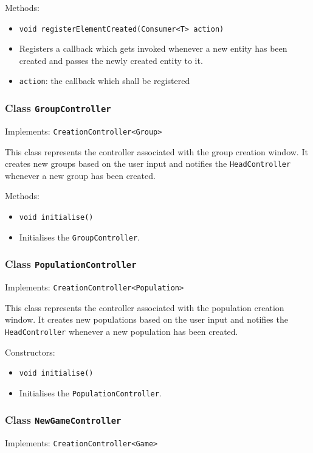 \documentclass[parskip=full,11pt]{scrartcl}
\begin{document}
Methods:
\begin{itemize}\itemsep -10pt
\item \texttt{void registerElementCreated(Consumer<T> action)}
\item[] Registers a callback which gets invoked whenever a new entity has been created and passes the newly created entity to it.
\item[] \texttt{action}: the callback which shall be registered
\end{itemize}

\subsubsection{Class \texttt{GroupController}}
Implements: \texttt{CreationController<Group>}

This class represents the controller associated with the group creation window. It creates new groups based on the user input and notifies the \texttt{HeadController} whenever a new group has been created.

Methods:
\begin{itemize}\itemsep -10pt
\item \texttt{void initialise()}
\item[] Initialises the \texttt{GroupController}.
\end{itemize}

\subsubsection{Class \texttt{PopulationController}}
Implements: \texttt{CreationController<Population>}

This class represents the controller associated with the population creation window. It creates new populations based on the user input and notifies the \texttt{HeadController} whenever a new population has been created.

Constructors:
\begin{itemize}\itemsep -10pt
\item \texttt{void initialise()}
\item[] Initialises the \texttt{PopulationController}.
\end{itemize}

\subsubsection{Class \texttt{NewGameController}}
Implements: \texttt{CreationController<Game>}
\end{document}
